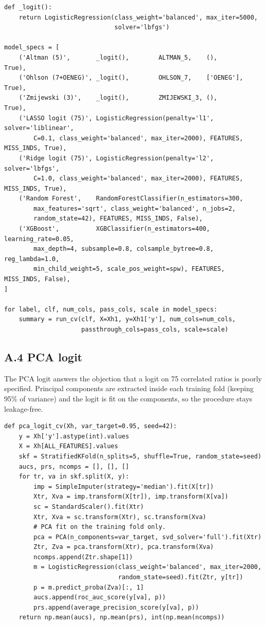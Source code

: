 \documentclass[12pt,a4paper]{article}
\begin{document}
\begin{lstlisting}[style=python]
def _logit():
    return LogisticRegression(class_weight='balanced', max_iter=5000,
                              solver='lbfgs')

model_specs = [
    ('Altman (5)',       _logit(),        ALTMAN_5,    (),        True),
    ('Ohlson (7+OENEG)', _logit(),        OHLSON_7,    ['OENEG'], True),
    ('Zmijewski (3)',    _logit(),        ZMIJEWSKI_3, (),        True),
    ('LASSO logit (75)', LogisticRegression(penalty='l1', solver='liblinear',
        C=0.1, class_weight='balanced', max_iter=2000), FEATURES, MISS_INDS, True),
    ('Ridge logit (75)', LogisticRegression(penalty='l2', solver='lbfgs',
        C=1.0, class_weight='balanced', max_iter=2000), FEATURES, MISS_INDS, True),
    ('Random Forest',    RandomForestClassifier(n_estimators=300,
        max_features='sqrt', class_weight='balanced', n_jobs=2,
        random_state=42), FEATURES, MISS_INDS, False),
    ('XGBoost',          XGBClassifier(n_estimators=400, learning_rate=0.05,
        max_depth=4, subsample=0.8, colsample_bytree=0.8, reg_lambda=1.0,
        min_child_weight=5, scale_pos_weight=spw), FEATURES, MISS_INDS, False),
]

for label, clf, num_cols, pass_cols, scale in model_specs:
    summary = run_cv(clf, X=Xh1, y=Xh1['y'], num_cols=num_cols,
                     passthrough_cols=pass_cols, scale=scale)
\end{lstlisting}

\subsection*{A.4 PCA logit}

The PCA logit answers the objection that a logit on 75 correlated ratios is
poorly specified. Principal components are extracted inside each training fold
(keeping 95\% of variance) and the logit is fit on the components, so the
procedure stays leakage-free.

\begin{lstlisting}[style=python]
def pca_logit_cv(Xh, var_target=0.95, seed=42):
    y = Xh['y'].astype(int).values
    X = Xh[ALL_FEATURES].values
    skf = StratifiedKFold(n_splits=5, shuffle=True, random_state=seed)
    aucs, prs, ncomps = [], [], []
    for tr, va in skf.split(X, y):
        imp = SimpleImputer(strategy='median').fit(X[tr])
        Xtr, Xva = imp.transform(X[tr]), imp.transform(X[va])
        sc = StandardScaler().fit(Xtr)
        Xtr, Xva = sc.transform(Xtr), sc.transform(Xva)
        # PCA fit on the training fold only.
        pca = PCA(n_components=var_target, svd_solver='full').fit(Xtr)
        Ztr, Zva = pca.transform(Xtr), pca.transform(Xva)
        ncomps.append(Ztr.shape[1])
        m = LogisticRegression(class_weight='balanced', max_iter=2000,
                               random_state=seed).fit(Ztr, y[tr])
        p = m.predict_proba(Zva)[:, 1]
        aucs.append(roc_auc_score(y[va], p))
        prs.append(average_precision_score(y[va], p))
    return np.mean(aucs), np.mean(prs), int(np.mean(ncomps))
\end{lstlisting}
\end{document}
